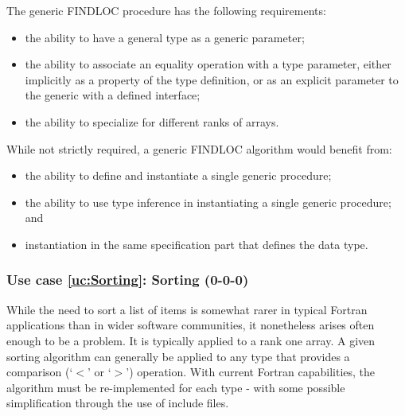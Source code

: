 \documentclass{article}
\newcounter{usecase}
\newcounter{requirement}
\newcommand{\newusecase}[2]{
\refstepcounter{usecase}\label{uc:#1}
\subsubsection{Use case \ref{uc:#1}: #1 (#2)}}
\begin{document}
The generic {\rm FINDLOC} procedure has the following requirements:
\begin{itemize}
\item the ability to have a general type as a generic parameter;

\item the ability to associate an equality operation with a type
  parameter, either implicitly
  as a property of the type definition, or as an explicit parameter to
  the generic with a defined interface;

\item the  ability to specialize for different ranks of arrays.

\end{itemize}
While not strictly required, a generic {\rm FINDLOC} algorithm would benefit
from:
\begin{itemize}
\item the ability to define and instantiate a single generic procedure;

\item the ability to use type inference in instantiating a single generic
  procedure; and

\item instantiation in the same specification part that defines the data
  type.
\end{itemize}

\newusecase{Sorting}{0-0-0}

While the need to sort a list of items is somewhat rarer in typical
Fortran applications than in wider software communities, it
nonetheless arises often enough to be a problem.   It is typically
applied to a rank one array.  A given sorting
algorithm can generally be applied to any type that provides a
comparison (`$<$' or `$>$') operation.   With current Fortran
capabilities, the algorithm must be re-implemented for each type -
with some possible simplification through the use of include files.
\end{document}
